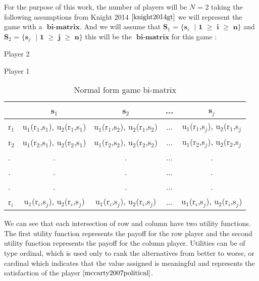\documentclass{book}
\begin{document}
For the purpose of this work, the number of players will be $\textit{N}$ = 2 taking the following assumptions from Knight 2014 $\cite{knight2014gt}$ we will represent the game with a $\textbf{ bi-matrix}$. And we will assume that  $\textbf{S$_1$ = \{s$_i$ $|$ 1  $\geq$ i $\geq$ n\}}$ and $\textbf{S$_2$ = \{s$_j$ $|$ 1  $\geq$ j $\geq$ n\}}$ this will be the $\textbf{ bi-matrix}$ for this game :
\begin{table}[h]
\begin{center}
Player 2

Player 1
\begin{tabular}{|l|c|c|c|c|}
\hline
& s$_1$ & s$_2$ & ... & s$_j$\\ 
\hline
r$_1$ & u$_1$(r$_1$,s$_1$), u$_2$(r$_1$,s$_1$) & u$_1$(r$_1$,s$_2$), u$_2$(r$_1$,s$_2$) & ... &  u$_1$(r$_1$,s$_j$), u$_2$(r$_1$,s$_j$\\
\hline
r$_2$ & u$_1$(r$_2$,s$_1$), u$_2$(r$_2$,s$_1$) & u$_1$(r$_2$,s$_2$), u$_2$(r$_2$,s$_2$) & ... &  u$_1$(r$_2$,s$_j$), u$_2$(r$_2$,s$_j$\\
\hline
. & . & . & ... & .\\
. & . & . & ... & .\\
. & . & . & ... & .\\
\hline
r$_i$ & u$_1$(r$_i$,s$_j$), u$_2$(r$_i$,s$_j$) & u$_1$(r$_i$,s$_j$), u$_2$(r$_i$,s$_j$) & ... &  u$_1$(r$_i$,s$_j$), u$_2$(r$_i$,s$_j$)\\
\hline
\end{tabular}
\caption{Normal form game bi-matrix}
\label{tab:normformgame}
\end{center}
\end{table}

We can see that each intersection of row and column have two utility functions. The first utility function represents the payoff for the row player and the second utility function represents the payoff for the column player. Utilities can be of type ordinal, which is used only to rank the alternatives from better to worse, or cardinal which indicates that the value assigned is meaningful and represents the satisfaction of the player $\cite{mccarty2007political}$.
\end{document}
